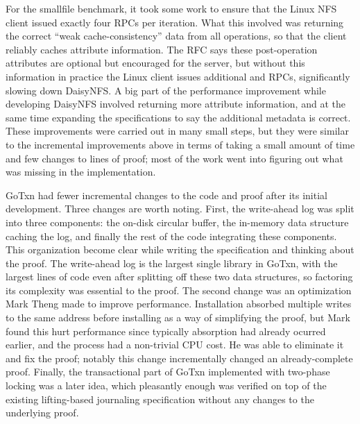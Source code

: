 For the smallfile benchmark, it took some work to ensure that the Linux NFS
client issued exactly four RPCs per iteration. What this involved was returning
the correct ``weak cache-consistency'' data from all operations, so that the
client reliably caches attribute information. The RFC says these post-operation
attributes are optional but encouraged for the server, but without this
information in practice the Linux client issues additional  and
 RPCs, significantly slowing down DaisyNFS. A big part of the
performance improvement while developing DaisyNFS involved returning more
attribute information, and at the same time expanding the specifications to say
the additional metadata is correct. These improvements were carried out in many
small steps, but they were similar to the incremental improvements above in
terms of taking a small amount of time and few changes to lines of proof; most
of the work went into figuring out what was missing in the implementation.

GoTxn had fewer incremental changes to the code and proof after its initial
development. Three changes are worth noting. First, the write-ahead log was
split into three components: the on-disk circular buffer, the in-memory data
structure caching the log, and finally the rest of the code integrating these
components. This organization become clear while writing the specification and
thinking about the proof. The write-ahead log is the largest single library in
GoTxn, with the largest lines of code even after splitting off these two data
structures, so factoring its complexity was essential to the proof. The second
change was an optimization Mark Theng made to improve performance. Installation
absorbed multiple writes to the same address before installing as a way of
simplifying the proof, but Mark found this hurt performance since typically absorption had already ocurred earlier, and the process had a non-trivial CPU cost. He was able to
eliminate it and fix the proof; notably this change incrementally changed an
already-complete proof. Finally, the transactional part of GoTxn implemented
with two-phase locking was a later idea,
which pleasantly enough was verified on top of the existing lifting-based
journaling specification without any changes to the underlying proof.

